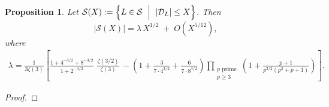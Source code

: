 \documentclass[11pt,reqno]{amsart}
\newcommand{\cD}{\mathcal{D}}
\newcommand{\cS}{\mathcal{S}}
\newtheorem{proposition}[theorem]{Proposition}
\theoremstyle{definition}
\theoremstyle{remark}
\begin{document}
\begin{proposition}\label{Count-S_3xC_2}
   Let $\cS(X) := \Bigl\{ L \in \mathcal{S} \ \Bigm|\ |\cD_L| \leq X \Bigr\}$. Then
    $$
      |\cS(X)| = \lambda\, X^{1/2}  \;+\; O\!\left(X^{5/12}\right),
    $$
    where
\begin{align*}
   \lambda = \frac{1}{3\zeta(3)}\left[ \frac{1+ 4^{-3/2} + 8^{-3/2}}{1+2^{-3/2}}\,\, \frac{\zeta(3/2)}{\zeta(3)} \, - \left(1 + \frac{3}{7\cdot 4^{3/2}} + \frac{6}{7\cdot 8^{3/2}}\right)\prod_{\substack{p\text{ prime}\\ p \geq 3}} \left(1 + \frac{p+1}{p^{3/2}(p^2+p+1)}\right) \right] .
\end{align*}

\end{proposition}
\begin{proof}
    

\end{proof}
\end{document}
